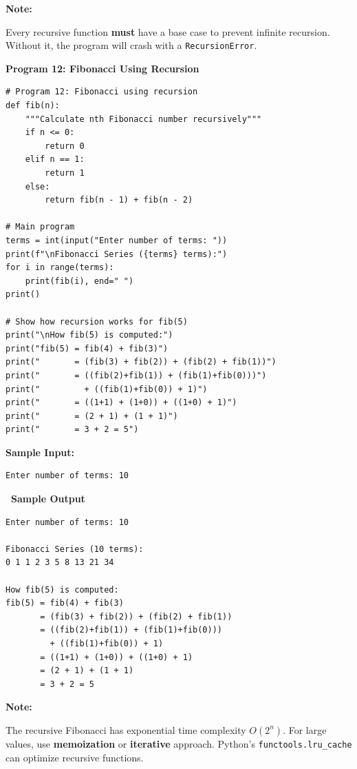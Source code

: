 \documentclass[12pt,a4paper]{article}
\newcommand{\outhead}{\noindent\colorbox{cmrgreen!25}%
  {\textbf{\small\color{cmrdark}~Sample Output~}}\par\vspace{-1pt}}
\newenvironment{notebox}{%
  \par\vspace{4pt}%
  \noindent\textbf{Note:}\par\vspace{2pt}%
  \begin{minipage}{\linewidth}%
  \small%
}{%
  \end{minipage}\par\vspace{4pt}%
}
\begin{document}
\begin{notebox}
Every recursive function \textbf{must} have a base case to prevent infinite recursion. Without it, the program will crash with a \texttt{RecursionError}.
\end{notebox}

\vspace{0.5cm}

\textbf{Program 12: Fibonacci Using Recursion}

\begin{lstlisting}
# Program 12: Fibonacci using recursion
def fib(n):
    """Calculate nth Fibonacci number recursively"""
    if n <= 0:
        return 0
    elif n == 1:
        return 1
    else:
        return fib(n - 1) + fib(n - 2)

# Main program
terms = int(input("Enter number of terms: "))
print(f"\nFibonacci Series ({terms} terms):")
for i in range(terms):
    print(fib(i), end=" ")
print()

# Show how recursion works for fib(5)
print("\nHow fib(5) is computed:")
print("fib(5) = fib(4) + fib(3)")
print("       = (fib(3) + fib(2)) + (fib(2) + fib(1))")
print("       = ((fib(2)+fib(1)) + (fib(1)+fib(0)))")
print("         + ((fib(1)+fib(0)) + 1)")
print("       = ((1+1) + (1+0)) + ((1+0) + 1)")
print("       = (2 + 1) + (1 + 1)")
print("       = 3 + 2 = 5")
\end{lstlisting}

\textbf{Sample Input:}
\begin{verbatim}
Enter number of terms: 10
\end{verbatim}

\outhead
\begin{lstlisting}[style=outputstyle]
Enter number of terms: 10

Fibonacci Series (10 terms):
0 1 1 2 3 5 8 13 21 34

How fib(5) is computed:
fib(5) = fib(4) + fib(3)
       = (fib(3) + fib(2)) + (fib(2) + fib(1))
       = ((fib(2)+fib(1)) + (fib(1)+fib(0)))
         + ((fib(1)+fib(0)) + 1)
       = ((1+1) + (1+0)) + ((1+0) + 1)
       = (2 + 1) + (1 + 1)
       = 3 + 2 = 5
\end{lstlisting}

\begin{notebox}
The recursive Fibonacci has exponential time complexity $O(2^n)$. For large values, use \textbf{memoization} or \textbf{iterative} approach. Python's \texttt{functools.lru\_cache} can optimize recursive functions.
\end{notebox}
\end{document}
